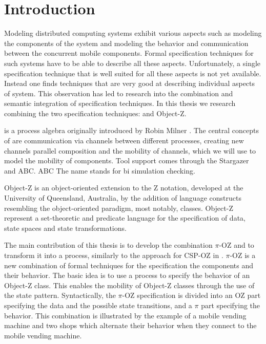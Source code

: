 \chapter{Introduction}
\pagestyle{scrheadings}	
\setcounter{page}{0}
\label{chp_introduction}
Modeling distributed computing systems exhibit various aspects such as modeling the components of the system and modeling the behavior and communication between the concurrent mobile components. Formal specification techniques for such systems have to be able to describe all these aspects. Unfortunately, a single specification technique that is well suited for all these aspects is not yet available. Instead one finds techniques that are very good at describing individual aspects of system. This observation has led to research into the combination and semantic integration of specification techniques. In this thesis we research combining the two specification techniques:
\picalc{} and Object-Z.

\picalc{} is a process algebra originally introduced by Robin Milner \cite{milner}. The central concepts of \picalc{} are communication via channels between different processes, creating new channels parallel composition and the mobility of channels, which we will use to model the mobility of components. Tool support comes through the Stargazer and ABC. ABC The name stands for bi simulation checking.

Object-Z is an object-oriented extension to the Z notation, developed at the University of Queensland, Australia, by the addition of language constructs resembling the object-oriented paradigm, most notably, classes. Object-Z represent a set-theoretic and predicate language for the specification of data, state spaces and state transformations.

The main contribution of this thesis is to develop the combination $\pi$-OZ and to transform it into a \picalc{} process, similarly to the approach for CSP-OZ in \cite{olderog}. $\pi$-OZ is a new combination of formal techniques
for the specification the components and their behavior. The basic idea is to use a \picalc{} process to specify the behavior of an Object-Z class. This enables the mobility of Object-Z classes through the use of the state pattern. Syntactically, the $\pi$-OZ specification is divided into an OZ part specifying the data and the possible state transitions, and a $\pi$ part specifying the behavior.  This combination is illustrated by the example of a mobile vending machine and two shops which alternate their behavior when they connect to the mobile vending machine.

